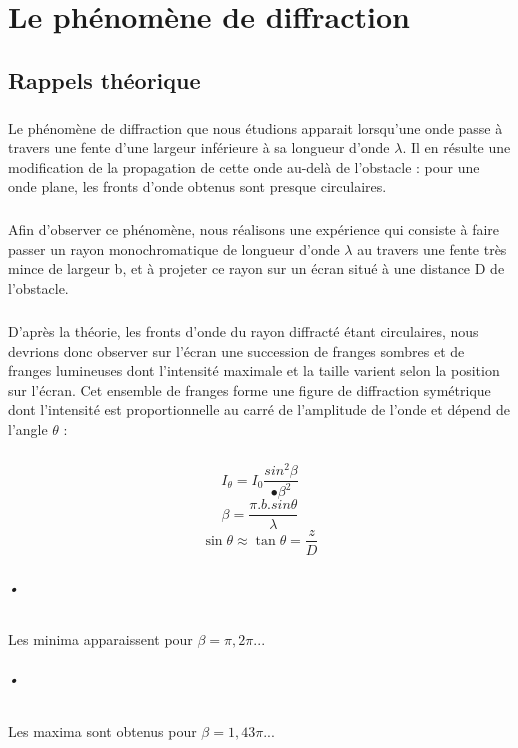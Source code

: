\documentclass[11pt,a4paper]{report}
\begin{document}
\tableofcontents
\chapter{Le phénomène de diffraction}
	\section{Rappels théorique}
\paragraph{}	
Le phénomène de diffraction que nous étudions apparait lorsqu'une onde passe à travers une fente d'une largeur inférieure à sa longueur d'onde $\lambda$. Il en résulte une modification de la propagation de cette onde  au-delà de l'obstacle : pour une onde plane, les fronts d'onde obtenus sont presque circulaires.
\paragraph{}
Afin d'observer ce phénomène, nous réalisons une expérience qui consiste à faire passer
un rayon monochromatique de longueur d'onde $\lambda$ au travers une fente très mince de largeur b, et à projeter ce rayon sur un écran situé à une distance D de l'obstacle. 
\paragraph{}
D'après la théorie, les fronts d'onde du rayon diffracté étant circulaires, nous devrions donc observer sur l'écran une succession de franges sombres et de franges lumineuses dont l'intensité maximale et la taille varient selon la position sur l'écran.
Cet ensemble de franges forme une figure de diffraction symétrique dont l'intensité est proportionnelle au carré de l'amplitude de l'onde et dépend de l'angle $\theta$ :
\paragraph{}
\begin{equation}
I_{\theta} = I_{0} \frac{sin^{2}\beta}{•\beta^{2}}
\end{equation}
\begin{equation}
\beta = \frac{\pi.b.sin\theta}{\lambda}
\end{equation}
\begin{equation}
\sin\theta \approx \tan\theta = \frac{z}{D}
\end{equation}
\paragraph{}
\subparagraph{•}
Les minima apparaissent pour $\beta = \pi,2\pi...$
\subparagraph{•}
Les maxima  sont obtenus pour $\beta = 1,43\pi...$
\end{document}
